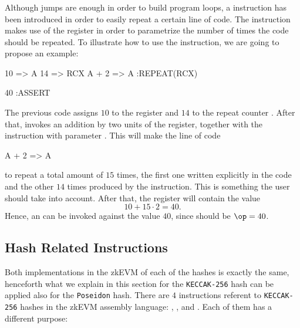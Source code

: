 \subsubsection{\REPEAT}

Although jumps are enough in order to build program loops, a \REPEAT instruction has been introduced in order to easily repeat a certain line of code. The \REPEAT instruction makes use of the \RCX register in order to parametrize the number of times the code should be repeated. To illustrate how to use the \REPEAT instruction, we are going to propose an example:

\begin{zkasm}
10 => A
14 => RCX
A + 2 => A  :REPEAT(RCX)

40  		:ASSERT 
\end{zkasm}

The previous code assigns $10$ to the \A register and $14$ to the repeat counter \RCX. After that, invokes an addition by two units of the \A register, together with the \REPEAT instruction with parameter \RCX. This will make the line of code 

\begin{zkasm}
A + 2 => A
\end{zkasm}

to repeat a total amount of $15$ times, the first one written explicitly in the code and the other $14$ times produced by the \REPEAT instruction. This is something the user should take into account. After that, the \A register will contain the value
\[
10 + 15 \cdot 2 = 40.
\]
Hence, an \ASSERT can be invoked against the value $40$, since \A should be $\op = 40$.  




\subsection{Hash Related Instructions}

Both implementations in the zkEVM of each of the hashes is exactly the same, henceforth what we explain in this section for the \texttt{KECCAK-256} hash can be applied also for the \texttt{Poseidon} hash. There are $4$ instructions referent to \texttt{KECCAK-256} hashes in the zkEVM assembly language: \HASHK, \HASHKONE, \HASHKLEN and \HASHKDIGEST. Each of them has a different purpose:

